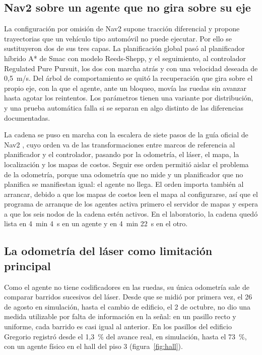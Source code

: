 \subsection{Nav2 sobre un agente que no gira sobre su eje}
\label{sec:nav2-ackermann}

La configuración por omisión de Nav2 supone tracción diferencial y propone trayectorias que un vehículo tipo automóvil no puede ejecutar. Por ello se sustituyeron dos de
sus tres capas. La planificación global pasó al planificador híbrido A* de Smac con modelo Reeds-Shepp, y el seguimiento, al controlador Regulated Pure Pursuit, los dos con
marcha atrás y con una velocidad deseada de 0,5~m/s. Del árbol de comportamiento se quitó la recuperación que gira sobre el propio eje, con la que el agente, ante un bloqueo,
movía las ruedas sin avanzar hasta agotar los reintentos. Los parámetros tienen una variante por distribución, y una prueba automática falla si se separan en algo distinto de
las diferencias documentadas.

La cadena se puso en marcha con la escalera de siete pasos de la guía oficial de Nav2 \autocite{nav2setup}, cuyo orden va de las transformaciones entre marcos de referencia al
planificador y el controlador, pasando por la odometría, el láser, el mapa, la localización y los mapas de costos. Seguir ese orden permitió aislar el problema de la odometría,
porque una odometría que no mide y un planificador que no planifica se manifiestan igual: el agente no llega. El orden importa también al arrancar, debido a que los mapas de
costos leen el mapa al configurarse, así que el programa de arranque de los agentes activa primero el servidor de mapas y espera a que los seis nodos de la cadena estén
activos. En el laboratorio, la cadena quedó lista en 4~min 4~s en un agente y en 4~min 22~s en el otro.

\subsection{La odometría del láser como limitación principal}
\label{sec:odometria-laser}

Como el agente no tiene codificadores en las ruedas, su única odometría sale de comparar barridos sucesivos del láser. Desde que se midió por primera vez, el 26 de agosto en
simulación, hasta el cambio de edificio, el 2 de octubre, no dio una medida utilizable por falta de información en la señal: en un pasillo recto y uniforme, cada barrido es casi igual al anterior. En los pasillos del edificio Gregorio registró desde el
1,3~\% del avance real, en simulación, hasta el 73~\%, con un agente físico en el hall del piso 3 (figura~\ref{fig:hall}).

